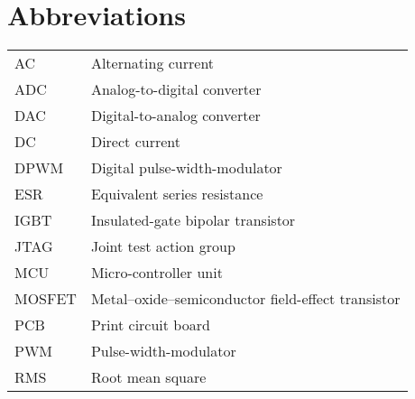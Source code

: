\section{Abbreviations}

\begingroup
\renewcommand{\arraystretch}{1.2} %
\begin{table}[h]
\begin{tabular}{ll}
AC & Alternating current\\
ADC & Analog-to-digital converter\\
DAC & Digital-to-analog converter\\
DC & Direct current\\
DPWM & Digital pulse-width-modulator\\
ESR & Equivalent series resistance\\
IGBT & Insulated-gate bipolar transistor \\
JTAG & Joint test action group\\
MCU & Micro-controller unit\\
MOSFET &  Metal–oxide–semiconductor field-effect transistor\\
PCB & Print circuit board\\
PWM & Pulse-width-modulator\\
RMS & Root mean square\\
\end{tabular}
\end{table}
\endgroup